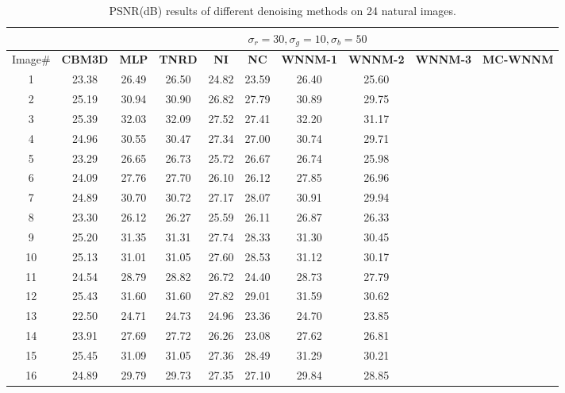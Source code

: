 \documentclass[10pt,onecolumn,letterpaper]{article}
\begin{document}
\begin{table}
\vspace{-1mm}
\caption{PSNR(dB) results of different denoising methods on 24 natural images.}
\label{t2}
\label{taba}
\begin{center}
\renewcommand\arraystretch{1.0}
\footnotesize
\begin{tabular}{|c||c|c|c|c|c|c|c|c|c|}
\hline
&\multicolumn{9}{c|}{ $\sigma_{r} = 30, \sigma_{g} = 10, \sigma_{b} = 50$}
\\
\hline
\hline
Image\#
&
\textbf{CBM3D}
&
\textbf{MLP}
&
\textbf{TNRD}
&
\textbf{NI}
&
\textbf{NC}
&
\textbf{WNNM-1}
&
\textbf{WNNM-2}
&
\textbf{WNNM-3}
&
\textbf{MC-WNNM}
\\
\hline
1 & 23.38 & 26.49 & 26.50 & 24.82 & 23.59 & 26.40 & 25.60 &  & \textbf{}
\\
\hline
2 & 25.19 & 30.94 & 30.90 & 26.82 & 27.79 & 30.89 & 29.75 &  & \textbf{}
\\
\hline
3 & 25.39 & 32.03 & 32.09 & 27.52 & 27.41 & 32.20 & 31.17 &  & \textbf{}
\\
\hline 
4 & 24.96 & 30.55 & 30.47 & 27.34 & 27.00 & 30.74 & 29.71 &  & \textbf{} 
\\
\hline
5 & 23.29 & 26.65 & 26.73 & 25.72 & 26.67 & 26.74 & 25.98 &  & \textbf{}
\\
\hline
6 & 24.09 & 27.76 & 27.70 & 26.10 & 26.12 & 27.85 & 26.96 &  & \textbf{}
\\
\hline
7 & 24.89 & 30.70 & 30.72 & 27.17 & 28.07 & 30.91 & 29.94 &  & \textbf{} 
\\
\hline
8 & 23.30 & 26.12 & 26.27 & 25.59 & 26.11 & 26.87 & 26.33 &  & \textbf{}
\\
\hline
9 & 25.20 & 31.35 & 31.31 & 27.74 & 28.33 & 31.30 & 30.45 &  & \textbf{}
\\
\hline
10 & 25.13 & 31.01 & 31.05 & 27.60 & 28.53 & 31.12 & 30.17 &  & \textbf{}
\\
\hline
11 & 24.54 & 28.79 & 28.82 & 26.72 & 24.40 & 28.73 & 27.79 &  & \textbf{}
\\
\hline
12 & 25.43 & 31.60 & 31.60 & 27.82 & 29.01 & 31.59 & 30.62 &  & \textbf{}
\\
\hline
13 & 22.50 & 24.71 & 24.73 & 24.96 & 23.36 & 24.70 & 23.85 &  & \textbf{}
\\
\hline
14 & 23.91 & 27.69 & 27.72 & 26.26 & 23.08 & 27.62 & 26.81 &  & \textbf{}
\\
\hline
15 & 25.45 & 31.09 & 31.05 & 27.36 & 28.49 & 31.29 & 30.21 &  & \textbf{}
\\
\hline
16 & 24.89 & 29.79 & 29.73 & 27.35 & 27.10 & 29.84 & 28.85 &  & \textbf{}

\end{tabular}
\end{center}
\end{table}
\end{document}
